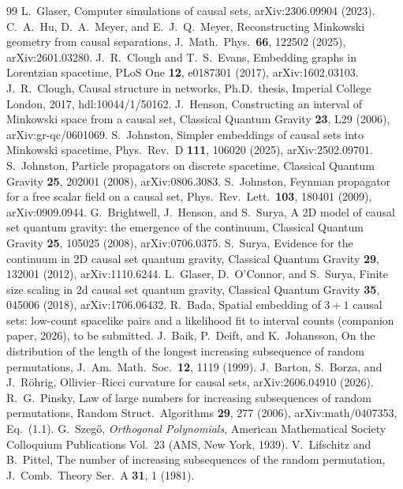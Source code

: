 \documentclass[prd,twocolumn,superscriptaddress,nofootinbib,amsmath,amssymb,floatfix]{revtex4-2}
\begin{document}
\begin{thebibliography}{99}
 L.~Glaser, Computer simulations of causal sets, arXiv:2306.09904 (2023).
 C.~A.~Hu, D.~A.~Meyer, and E.~J.~Q.~Meyer, Reconstructing Minkowski geometry from causal separations, J.\ Math.\ Phys.\ \textbf{66}, 122502 (2025), arXiv:2601.03280.
 J.~R.~Clough and T.~S.~Evans, Embedding graphs in Lorentzian spacetime, PLoS One \textbf{12}, e0187301 (2017), arXiv:1602.03103.
 J.~R.~Clough, Causal structure in networks, Ph.D.\ thesis, Imperial College London, 2017, hdl:10044/1/50162.
 J.~Henson, Constructing an interval of Minkowski space from a causal set, Classical Quantum Gravity \textbf{23}, L29 (2006), arXiv:gr-qc/0601069.
 S.~Johnston, Simpler embeddings of causal sets into Minkowski spacetime, Phys.\ Rev.\ D \textbf{111}, 106020 (2025), arXiv:2502.09701.
 S.~Johnston, Particle propagators on discrete spacetime, Classical Quantum Gravity \textbf{25}, 202001 (2008), arXiv:0806.3083.
 S.~Johnston, Feynman propagator for a free scalar field on a causal set, Phys.\ Rev.\ Lett.\ \textbf{103}, 180401 (2009), arXiv:0909.0944.
 G.~Brightwell, J.~Henson, and S.~Surya, A 2D model of causal set quantum gravity: the emergence of the continuum, Classical Quantum Gravity \textbf{25}, 105025 (2008), arXiv:0706.0375.
 S.~Surya, Evidence for the continuum in 2D causal set quantum gravity, Classical Quantum Gravity \textbf{29}, 132001 (2012), arXiv:1110.6244.
 L.~Glaser, D.~O'Connor, and S.~Surya, Finite size scaling in 2d causal set quantum gravity, Classical Quantum Gravity \textbf{35}, 045006 (2018), arXiv:1706.06432.
 R.~Bada, Spatial embedding of $3+1$ causal sets: low-count spacelike pairs and a likelihood fit to interval counts (companion paper, 2026), to be submitted.
 J.~Baik, P.~Deift, and K.~Johansson, On the distribution of the length of the longest increasing subsequence of random permutations, J.\ Am.\ Math.\ Soc.\ \textbf{12}, 1119 (1999).
 J.~Barton, S.~Borza, and J.~R\"ohrig, Ollivier--Ricci curvature for causal sets, arXiv:2606.04910 (2026).
 R.~G.~Pinsky, Law of large numbers for increasing subsequences of random permutations, Random Struct.\ Algorithms \textbf{29}, 277 (2006), arXiv:math/0407353, Eq.~(1.1).
 G.~Szeg\H{o}, \emph{Orthogonal Polynomials}, American Mathematical Society Colloquium Publications Vol.~23 (AMS, New York, 1939).
 V.~Lifschitz and B.~Pittel, The number of increasing subsequences of the random permutation, J.\ Comb.\ Theory Ser.\ A \textbf{31}, 1 (1981).

\end{thebibliography}
\end{document}
